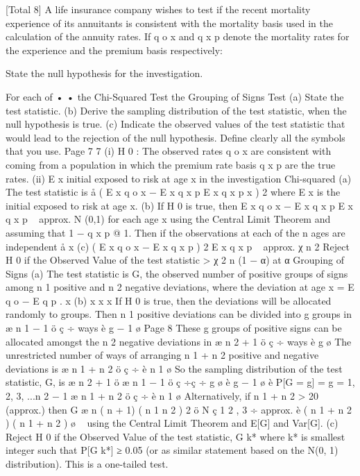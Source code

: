 \documentclass[a4paper,1pt]{article}
\begin{document}
[Total 8]
A life insurance company wishes to test if the recent mortality experience of its
annuitants is consistent with the mortality basis used in the calculation of the
annuity rates.
If q o x and q x p denote the mortality rates for the experience and the premium basis
respectively:
\item  State the null hypothesis for the investigation.
\item  For each of
•
•
the Chi-Squared Test
the Grouping of Signs Test
(a) State the test statistic.
(b) Derive the sampling distribution of the test statistic, when the null
hypothesis is true.
(c) Indicate the observed values of the test statistic that would lead to
the rejection of the null hypothesis.
Define clearly all the symbols that you use.
Page 7 %
7
(i)
H 0 : The observed rates q o x are consistent with coming from a population in
which the premium rate basis q x p are the true rates.
(ii)
E x initial exposed to risk at age x in the investigation
Chi-squared
(a)
The test statistic is
å
(
E x q o x − E x q x p
E x q x p
x
)
2
where E x is the initial exposed to risk at age x.
(b)
If H 0 is true, then
E x q o x − E x q x p
E x q x p
~
approx.
N (0,1)
for each age x using the Central Limit Theorem and assuming that
1 − q x p @ 1.
Then if the observations at each of the n ages are independent
å
x
(c)
( E x q o x − E x q x p ) 2
E x q x p
~
approx.
χ n 2
Reject H 0 if the Observed Value of the test statistic > χ 2 n (1 − α) at
α%
Grouping of Signs
(a)
The test statistic is G, the observed number of positive groups of
signs among n 1 positive and n 2 negative deviations, where the
deviation at age x = E q o − E q p .
x
(b)
x
x
x
If H 0 is true, then the deviations will be allocated randomly to
groups.
Then n 1 positive deviations can be divided into g groups in
æ n 1 − 1 ö
ç
÷ ways
è g − 1 ø
Page 8 %
These g groups of positive signs can be allocated amongst the n 2
negative deviations in
æ n 2 + 1 ö
ç
÷ ways
è g ø
The unrestricted number of ways of arranging n 1 + n 2 positive and
negative deviations is
æ n 1 + n 2 ö
ç
÷
è n 1 ø
So the sampling distribution of the test statistic, G, is
æ n 2 + 1 ö æ n 1 − 1 ö
ç
÷ç
÷
g ø è g − 1 ø
è
P[G = g] =
g = 1, 2, 3, ...n 2 − 1
æ n 1 + n 2 ö
ç
÷
è n 1 ø
Alternatively, if n 1 + n 2 > 20 (approx.) then
G
æ n ( n + 1) ( n 1 n 2 ) 2 ö
N ç 1 2
,
3 ÷
approx.
è ( n 1 + n 2 ) ( n 1 + n 2 ) ø
~
using the Central Limit Theorem and E[G] and Var[G].
(c)
Reject H 0 if the Observed Value of the test statistic, G \leq  k* where
k* is smallest integer such that
P[G \leq  k*] ≥ 0.05
(or as similar statement based on the N(0, 1) distribution). This is
a one-tailed test.
\end{document}
